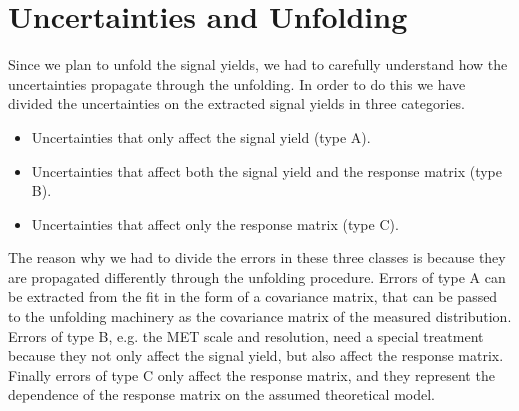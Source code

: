 \section{Uncertainties and Unfolding}
\label{sec:uncunf}
Since we plan to unfold the signal yields, we had to carefully understand how the uncertainties propagate through the unfolding.
In order to do this we have divided the uncertainties on the extracted signal yields in three categories.
\begin{itemize}
\item Uncertainties that only affect the signal yield (type A).
\item Uncertainties that affect both the signal yield and the response matrix (type B).
\item Uncertainties that affect only the response matrix (type C).
\end{itemize}
The reason why we had to divide the errors in these three classes is because they are propagated differently through the unfolding procedure. Errors of type A can be extracted from the fit in the form of a covariance matrix, that can be passed to the unfolding machinery as the covariance matrix of the measured distribution. 
Errors of type B, e.g. the MET scale and resolution, need a special treatment because they not only affect the signal yield, but also affect the response matrix.
Finally errors of type C only affect the response matrix, and they represent the dependence of the response matrix on the assumed theoretical model.


